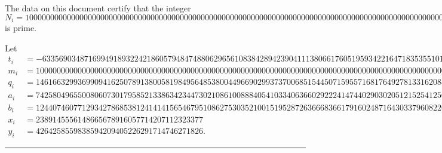\documentclass[12pt]{extarticle}
\begin{document}
\pagestyle{empty}
\phantom{a}
\vspace{2em}

\begin{center}
{\Huge {}}
\end{center}
\vspace{2em}

\noindent The data on this document certify that the integer
{\tiny
$$
N_i = 100000000000000000000000000000000000000000000000000000000000000000000000000000000000000000000000000000000000000000000000000000000000000000000000000000000000000000000000000000000000000000000000000000357
$$
}
is prime.

\vspace{2em}

\noindent Let
{\tiny
\begin{align*}
t_i &= -6335690348716994918932242186057948474880629656108384289423904111380661760519593422164718353551013546 \\
m_i &= 100000000000000000000000000000000000000000000000000000000000000000000000000000000000000000000000000006335690348716994918932242186057948474880629656108384289423904111380661760519593422164718353551013904 \\
q_i &= 14616632993699094162507891380058198495648538004496690299373700685154450715955716817649278133162088703122322814363862903483990860047189573613364053330927160117454315740969674181 \\
a_i &= 742580496550080607301795852133863423447302108610088840541033406366029222414744029030205121525412568293003434360165896475777951425449738125423441762238777452927677115048107566568577487 \\
b_i &= 1244074607712934278685381241414156546795108627530352100151952872636668366179160248716430337960822609302325007479659899041931633334788668616204816432324851439289101814794336911238759356] \\
x_i &= 2389145556148665678916057714207112323377 \\
y_i &= 4264258559838594209405226291714746271826.
\end{align*}
}

\vspace{0.5em}
\hrule
\vspace{0.5em}
\end{document}
